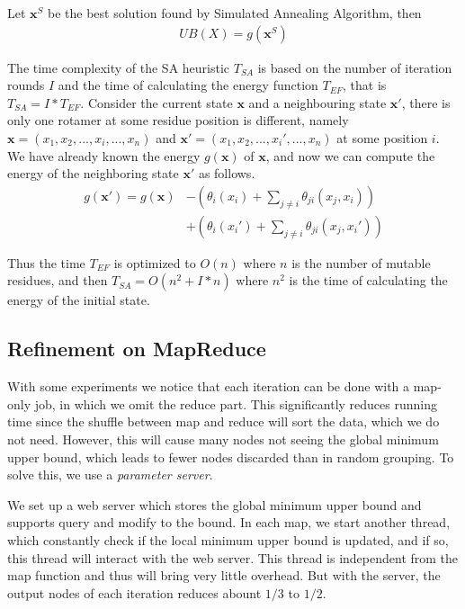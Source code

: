 Let $\mathbf{x}^{S}$ be the best solution found by Simulated Annealing Algorithm, then
\begin{align*}
  UB(X)=g(\mathbf{x}^{S})
\end{align*}

The time complexity of the SA heuristic $T_{SA}$ is based on the number of iteration rounds $I$ and the time of calculating the energy function $T_{EF}$, that is $T_{SA}=I*T_{EF}$. Consider the current state $\mathbf{x}$ and a neighbouring state $\mathbf{x}'$, there is only one rotamer at some residue position is different, namely $\mathbf{x}=(x_1,x_2,...,x_i,...,x_n)$ and $\mathbf{x}'=(x_1,x_2,...,x_i',...,x_n)$ at some position $i$. We have already known the energy $g(\mathbf{x})$ of $\mathbf{x}$, and now we can compute the energy of the neighboring state $\mathbf{x}'$ as follows.
\begin{align*}
g(\mathbf{x}')=g(\mathbf{x})&-\left(\theta_i(x_i)+\sum_{j\neq i}\theta_{ji}(x_j,x_i)\right)\\
&+\left(\theta_i(x_i')+\sum_{j\neq i}\theta_{ji}(x_j,x_i')\right)
\end{align*}

Thus the time $T_{EF}$ is optimized to $O(n)$ where $n$ is the number of mutable residues, and then $T_{SA}=O(n^2+I*n)$ where $n^2$ is the time of calculating the energy of the initial state.

\subsection{Refinement on MapReduce}
    With some experiments we notice that each iteration can be done with a map-only job, in which we omit the reduce part. This significantly reduces running time since the shuffle between map and reduce will sort the data, which we do not need. However, this will cause many nodes not seeing the global minimum upper bound, which leads to fewer nodes discarded than in random grouping. To solve this, we use a \textit{parameter server}.

    We set up a web server which stores the global minimum upper bound and supports query and modify to the bound. In each map, we start another thread, which constantly check if the local minimum upper bound is updated, and if so, this thread will interact with the web server. This thread is independent from the map function and thus will bring very little overhead. But with the server, the output nodes of each iteration reduces abount $1/3$ to $1/2$.
